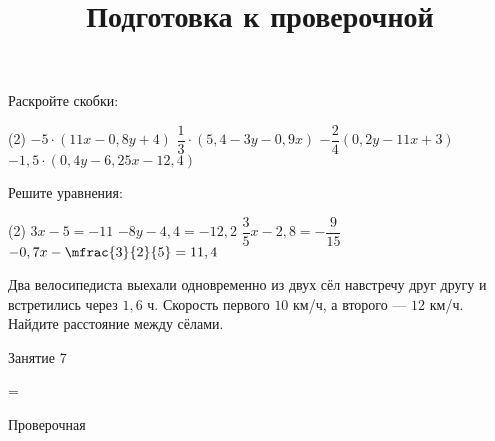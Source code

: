 \begin{homework}[number=3]
	\begin{listofex}
		\item Раскройте скобки:
		\begin{tasks}(2)
			\task \( -5 \cdot (11x-0,8y+4) \)
			\task \( \dfrac{ 1 }{ 3 } \cdot (5,4-3y-0,9x) \)
			\task \( -\dfrac{ 2 }{ 4 } \left( 0,2y-11x + 3 \right) \)
			\task \( -1,5 \cdot (0,4y-6,25x-12,4) \)
		\end{tasks}
		\item Решите уравнения:
		\begin{tasks}(2)
			\task \( 3x-5=-11 \)
			\task \( -8y-4,4=-12,2 \)
			\task \( \dfrac{ 3 }{ 5 }x-2,8=-\dfrac{ 9 }{ 15 } \)
			\task \( -0,7x-\mfrac{3 }{2 }{5 }=11,4 \)
		\end{tasks}
		\item Два велосипедиста выехали одновременно из двух сёл навстречу друг другу и встретились через \(1,6\) ч. Скорость первого \(10\) км/ч, а второго --- \(12\) км/ч. Найдите расстояние между сёлами.
	\end{listofex}
\end{homework}

\begin{class}[number=7]
	\title{Подготовка к проверочной}
	\begin{listofex}
		\item Занятие 7
	\end{listofex}
\end{class}

=%
\begin{exam}
	\begin{listofex}
		\item Проверочная
	\end{listofex}
\end{exam}
